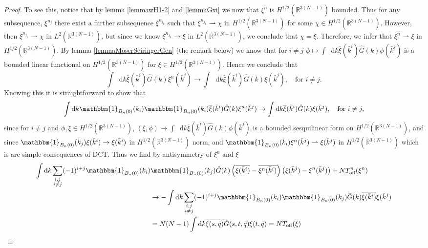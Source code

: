\documentclass[a4paper,11pt]{article}
\newcommand*\diff{\mathop{}\!\mathrm{d}}
\newcommand{\R}{\mathbb{R}}
\numberwithin{equation}{section}
\begin{document}
\begin{proof}
To see this, notice that by lemma \ref{lemmawH1-2} and \ref{lemmaGxi} we now that $ \xi^n $ is $ H^{1/2}(\R^{3(N-1)}) $ bounded. Thus for any subsequence, $ \xi^{n_j} $ there exist a further subsequence $ \xi^{n_{j_k}} $ such that $ \xi^{n_{j_k}} \rightharpoonup \chi  $ in $ H^{1/2}(\R^{3(N-1)}) $ for some $ \chi\in H^{1/2}(\R^{3(N-1)}) $. However, then $ \xi^{n_{j_k}} \rightharpoonup \chi $ in $ L^{2}(\R^{3(N-1)}) $, but since we know $ \xi^{n_{j_k}} \to \xi $ in $ L^{2}(\R^{3(N-1)}) $, we conclude that $ \chi=\xi $. Therefore, we infer that $ \xi^n\rightharpoonup\xi $ in $ H^{1/2}(\R^{3(N-1)}) $. By lemma \ref{lemmaMoserSeiringerGen} (the remark below) we know that for $ i\neq j $ $ \phi\mapsto \int\diff k\overline{\xi}(\bar{k}^i)\hat{G}(k)\phi(\bar{k}^j)$ is a bounded linear functional on $ H^{1/2}(\R^{3(N-1)}) $ for $ \xi\in H^{1/2}(\R^{3(N-1)})  $. Hence we conclude that \begin{equation}
\int\diff k\overline{\xi}(\bar{k}^i)\hat{G}(k)\xi^n(\bar{k}^j)\to\int\diff k\overline{\xi}(\bar{k}^i)\hat{G}(k)\xi(\bar{k}^j),\quad\text{for }i\neq j.
\end{equation}
Knowing this it is straightforward to show that \begin{equation}
\int\diff k\mathbbm{1}_{B_n(0)}(k_i)\mathbbm{1}_{B_n(0)}(k_i)\overline{\xi}(\bar{k}^i)\hat{G}(k)\xi^n(\bar{k}^j)\to\int\diff k\overline{\xi}(\bar{k}^i)\hat{G}(k)\xi(\bar{k}^j),\quad\text{for }i\neq j,
\end{equation}
since for $ i\neq j $ and $ \phi,\xi\in H^{1/2}(\R^{3(N-1)}) $, $ (\xi,\phi)\mapsto \int\diff k\overline{\xi}(\bar{k}^i)\hat{G}(k)\phi(\bar{k}^j)$ is a bounded sesquilinear form on $ H^{1/2}(\R^{3(N-1)}) $, and since $ \mathbbm{1}_{B_n(0)}(k_j)\xi(\bar{k}^i)\to\xi(\bar{k}^i) $ in $ H^{1/2}(\R^{3(N-1)}) $ norm, and $ \mathbbm{1}_{B_n(0)}(k_i)\xi^n(\bar{k}^j)\rightharpoonup\xi(\bar{k}^j) $ in $ H^{1/2}(\R^{3(N-1)}) $ which is are simple consequences of DCT. Thus we find by antisymmetry of $ \xi^n $ and $ \xi $\begin{equation}\label{EqConOff}
\begin{aligned}
\int\diff k\sum_{\substack{i,j\\i\neq j}}(-1)^{i+j}\mathbbm{1}_{B_n(0)}(k_i)&\mathbbm{1}_{B_n(0)}(k_j)\hat{G}(k)\left(\overline{\xi(\bar{k}^i)}-\overline{\xi^n(\bar{k}^i)}\right)\left(\xi(\bar{k}^j)-\xi^n(\bar{k}^j)\right)+NT^n_{\text{off}}(\xi^n)\\
&\to -\int\diff k\sum_{\substack{i,j\\i\neq j}}(-1)^{i+j}\mathbbm{1}_{B_n(0)}(k_i)\mathbbm{1}_{B_n(0)}(k_j)\hat{G}(k)\overline{\xi(\bar{k}^i)}\xi(\bar{k}^j)\\&=N(N-1)\int\diff k \overline{\xi(s,\bar{q})}\hat{G}(s,t,\bar{q})\xi(t,\bar{q})=NT_{\text{off}}(\xi)

\end{aligned}
\end{equation}
\end{proof}
\end{document}
